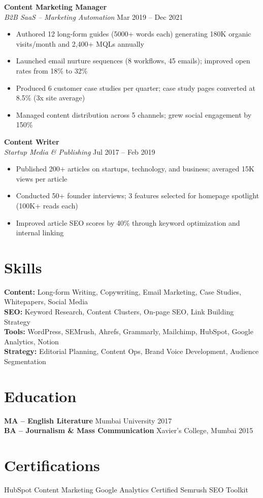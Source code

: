 \documentclass[10.5pt,a4paper]{article}
\begin{document}
\textbf{Content Marketing Manager} \enspace\textbar{}\\
\textit{B2B SaaS -- Marketing Automation} \hfill Mar 2019 -- Dec 2021
\begin{itemize}
  \item Authored 12 long-form guides (5000+ words each) generating 180K organic visits/month and 2,400+ MQLs annually
  \item Launched email nurture sequences (8 workflows, 45 emails); improved open rates from 18\% to 32\%
  \item Produced 6 customer case studies per quarter; case study pages converted at 8.5\% (3x site average)
  \item Managed content distribution across 5 channels; grew social engagement by 150\%
\end{itemize}

\textbf{Content Writer} \enspace\textbar{}\\
\textit{Startup Media \& Publishing} \hfill Jul 2017 -- Feb 2019
\begin{itemize}
  \item Published 200+ articles on startups, technology, and business; averaged 15K views per article
  \item Conducted 50+ founder interviews; 3 features selected for homepage spotlight (100K+ reads each)
  \item Improved article SEO scores by 40\% through keyword optimization and internal linking
\end{itemize}

\section{Skills}
\textbf{Content:} Long-form Writing, Copywriting, Email Marketing, Case Studies, Whitepapers, Social Media\\
\textbf{SEO:} Keyword Research, Content Clusters, On-page SEO, Link Building Strategy\\
\textbf{Tools:} WordPress, SEMrush, Ahrefs, Grammarly, Mailchimp, HubSpot, Google Analytics, Notion\\
\textbf{Strategy:} Editorial Planning, Content Ops, Brand Voice Development, Audience Segmentation

\section{Education}
\textbf{MA -- English Literature} \hfill Mumbai University \hfill 2017\\
\textbf{BA -- Journalism \& Mass Communication} \hfill Xavier's College, Mumbai \hfill 2015

\section{Certifications}
HubSpot Content Marketing \enspace\textperiodcentered\enspace Google Analytics Certified \enspace\textperiodcentered\enspace Semrush SEO Toolkit
\end{document}
